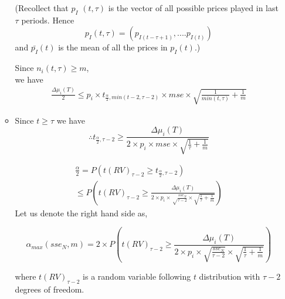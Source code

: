 \documentclass[compress, serif, onlymath, professionalfonts]{beamer}
\begin{document}
\begin{frame}[t,allowframebreaks]
\begin{enumerate}
\begin{itemize}
(Recollect that $p_I$ $(t,\tau )$ is the vector of all possible prices played in last $\tau $ periods. Hence
$$p_I(t,\tau) = (p_{I(t-\tau +1)},....p_{I(t)})$$
and $\bar{p_I} (t)$ is the mean of all the prices in $p_I (t)$.)


Since $ n_i(t,\tau) \geq m$,\\
we have 
\begin{multline}
\label{assmp_1}
\frac{\Delta\mu_i(T)}{2} \leq p_i\times t_{\frac{\alpha}{2},min(t-2,\tau-2)}\times mse \times \sqrt{\frac{1}{min(t,\tau)}+\frac{1}{m}}
\end{multline}
\item
Since $t\geq \tau$ we have
$$\therefore t_{\frac{\alpha}{2},\tau-2} \geq \frac{\Delta\mu_i(T)}{2\times p_i \times mse \times \sqrt{\frac{1}{\tau}+\frac{1}{m}}} $$


\begin{multline}\label{dagger}
\frac{\alpha}{2} = P(t(RV)_{\tau-2}\geq t_{\frac{\alpha}{2},\tau-2} )\\
\leq  P(t(RV)_{\tau-2} \geq \frac{\Delta\mu_i(T)}{2\times p_i \times \sqrt\frac{sse_N}{\tau-2} \times \sqrt{\frac{1}{\tau}+\frac{1}{m}}}  )	
\end{multline}
Let us denote the right hand side as, 

\begin{equation}\label{definition} \alpha_{max}(sse_N,m)= 2\times P(t(RV)_{\tau-2} \geq \frac{\Delta\mu_i(T)}{2\times p_i \times \sqrt{\frac{sse_N}{\tau-2}} \times \sqrt{\frac{1}{\tau}+\frac{1}{m}}}  )
\end{equation}


where $t(RV)_{\tau-2}$ is a random variable following $t$ distribution with $\tau-2$ degrees of freedom.





 




\end{itemize}
\end{enumerate}
\end{frame}
\end{document}
